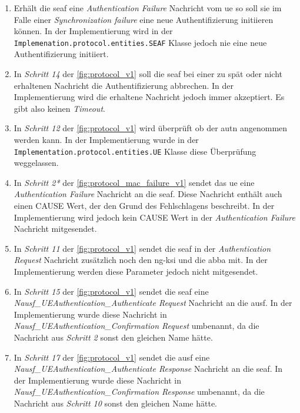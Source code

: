 \begin{enumerate}
\item Erhält die \gls{seaf} eine \textit{Authentication Failure} Nachricht vom \gls{ue} so soll sie im Falle einer \textit{Synchronization failure} eine neue Authentifizierung initiieren können.
In der Implementierung wird in der \lstinline{Implemenation.protocol.entities.SEAF} Klasse jedoch nie eine neue Authentifizierung initiiert.

\item In \textit{Schritt 14} der \cref{fig:protocol_v1} soll die \gls{seaf} bei einer zu spät oder nicht erhaltenen Nachricht die Authentifizierung abbrechen.
In der Implementierung wird die erhaltene Nachricht jedoch immer akzeptiert.
Es gibt also keinen \textit{Timeout}.

\item In \textit{Schritt 12} der \cref{fig:protocol_v1} wird überprüft ob der \gls{autn} angenommen werden kann.
In der Implementierung wurde in der \lstinline{Implementation.protocol.entities.UE} Klasse diese Überprüfung weggelassen.

\item In \textit{Schritt 2*} der \cref{fig:protocol_mac_failure_v1} sendet das \gls{ue} eine \textit{Authentication Failure} Nachricht an die \gls{seaf}.
Diese Nachricht enthält auch einen CAUSE Wert, der den Grund des Fehlschlagens beschreibt.
In der Implementierung wird jedoch kein CAUSE Wert in der \textit{Authentication Failure} Nachricht mitgesendet.

\item In \textit{Schritt 11} der \cref{fig:protocol_v1} sendet die \gls{seaf} in der \textit{Authentication Request} Nachricht zusätzlich noch den \gls{ng-ksi} und die \gls{abba} mit.
In der Implementierung werden diese Parameter jedoch nicht mitgesendet.

\item In \textit{Schritt 15} der \cref{fig:protocol_v1} sendet die \gls{seaf} eine \textit{Nausf\_UEAuthentication\_Authenticate Request} Nachricht an die \gls{ausf}.
In der Implementierung wurde diese Nachricht in \textit{Nausf\_UEAuthentication\_Confirmation Request} umbenannt, da die Nachricht aus \textit{Schritt 2} sonst den gleichen Name hätte.

\item In \textit{Schritt 17} der \cref{fig:protocol_v1} sendet die \gls{ausf} eine \textit{Nausf\_UEAuthentication\_Authenticate Response} Nachricht an die \gls{seaf}.
In der Implementierung wurde diese Nachricht in \textit{Nausf\_UEAuthentication\_Confirmation Response} umbenannt, da die Nachricht aus \textit{Schritt 10} sonst den gleichen Name hätte.


\end{enumerate}
